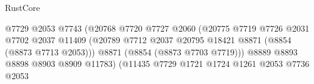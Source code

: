 \begin{lexlean}{RustCore}
\begin{coremodule}
                                                            @7729
                                                            @2053
                                                            @7743
                                                            (@20768
                                                              @7720
                                                              @7727
                                                              @2060
                                                              (@20775
                                                                @7719
                                                                @7726
                                                                @2031
                                                                @7702
                                                                @2037
                                                                @11409
                                                                (@20789
                                                                  @7712
                                                                  @2037
                                                                  @20795
                                                                  @18421
                                                                  @8871
                                                                  (@8854 (@8873 @7713 @2053)))
                                                                @8871
                                                                (@8854 (@8873 @7703 @7719)))
                                                              @8889
                                                              @8893
                                                              @8898
                                                              @8903
                                                              @8909
                                                              @11783)
                                                            (@11435
                                                              @7729
                                                              @1721
                                                              @1724
                                                              @1261
                                                              @2053
                                                              @7736
                                                              @2053

\end{coremodule}
\end{lexlean}

